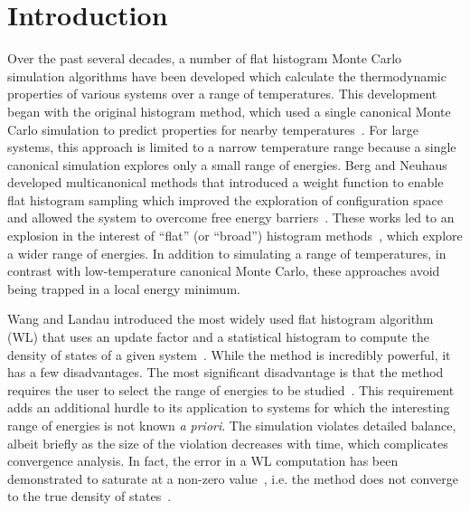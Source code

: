 \documentclass[letterpaper,twocolumn,amsmath,amssymb,pre,aps,10pt]{revtex4-1}
\begin{document}
\section{Introduction}
Over the past several decades, a number of flat histogram Monte Carlo simulation
algorithms have been developed which calculate the thermodynamic properties of
various systems over a range of temperatures.  This development began with the
original histogram method, which used a single canonical Monte Carlo simulation
to predict properties for nearby temperatures~\cite{ferrenberg1988new}.  For
large systems, this approach is limited to a narrow temperature range because a
single canonical simulation explores only a small range of energies. Berg and
Neuhaus developed multicanonical methods that introduced a weight function to
enable flat histogram sampling which improved the exploration of configuration
space and allowed the system to overcome free energy
barriers~\cite{berg1991multicanonical, berg1992multicanonical}. These works led
to an explosion in the interest of ``flat'' (or ``broad'') histogram
methods~\cite{penna1996broad, penna1998broad, swendsen1999transition,
wang2001determining, wang2001efficient, landau2004new, schulz2003avoiding,
yan2003fast, trebst2004optimizing, belardinelli2007wang, belardinelli2007fast,
belardinelli2008analysis, belardinelli2014intrinsic, singh2012density,
zhou2008optimal, schneider2017convergence, liang2006theory, liang2007stochastic,
liang2009improving, werlich2015stochastic, kim2006statistical,
kim2007statistical, kim2009replica, junghans2014molecular}, which explore a
wider range of energies. In addition to simulating a range of temperatures, in
contrast with low-temperature canonical Monte Carlo, these approaches
avoid being trapped in a local energy minimum.


Wang and Landau introduced the most widely used flat histogram algorithm (WL)
that uses an update factor and a statistical histogram to compute the density of
states of a given system~\cite{wang2001determining, wang2001efficient}.  While
the method is incredibly powerful, it has a few disadvantages. The most
significant disadvantage is that the method requires the user to select the
range of energies to be studied~\cite{landau2004new, wang2001efficient,
schulz2003avoiding, yan2003fast}. This requirement adds an additional
hurdle to its application to systems for which the interesting range of energies
is not known \emph{a priori}.  The simulation violates detailed balance, albeit
briefly as the size of the violation decreases with time, which complicates
convergence analysis.  In fact, the error in a WL computation has been
demonstrated to saturate at a non-zero value~\cite{yan2003fast}, i.e. the method
does not converge to the true density of states~\cite{belardinelli2007wang,
belardinelli2007fast, belardinelli2008analysis, belardinelli2014intrinsic,
singh2012density, zhou2008optimal}.
\end{document}
